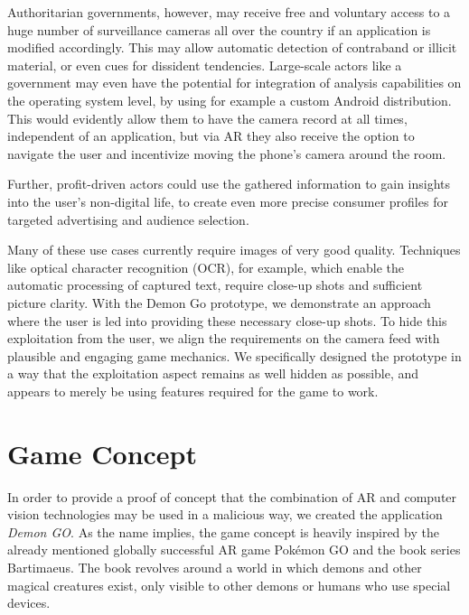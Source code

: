 Authoritarian governments, however, may receive free and voluntary access to a huge number of surveillance cameras all over the country if an application is modified accordingly. This may allow automatic detection of contraband or illicit material, or even cues for dissident tendencies. Large-scale actors like a government may even have the potential for integration of analysis capabilities on the operating system level, by using for example a custom Android distribution.
This would evidently allow them to have the camera record at all times, independent of an application, but via AR they also receive the option to navigate the user and incentivize moving the phone's camera around the room.

Further, profit-driven actors could use the gathered information to gain insights into the user's non-digital life, to create even more precise consumer profiles for targeted advertising and audience selection.

Many of these use cases currently require images of very good quality.
Techniques like optical character recognition (OCR), for example, which enable the automatic processing of captured text, require close-up shots and sufficient picture clarity.
With the Demon Go prototype, we demonstrate an approach where the user is led into providing these necessary close-up shots.
To hide this exploitation from the user, we align the requirements on the camera feed with plausible and engaging game mechanics.
We specifically designed the prototype in a way that the exploitation aspect remains as well hidden as possible, and appears to merely be using features required for the game to work.

\section{Game Concept}
\label{sec:concept}

In order to provide a proof of concept that the combination of AR and computer vision technologies may be used in a malicious way, we created the application \emph{Demon GO}.
As the name implies, the game concept is heavily inspired by the already mentioned globally successful AR game Pokémon GO and the book series Bartimaeus. The book revolves around a world in which demons and other magical creatures exist, only visible to other demons or humans who use special devices.~\cite{stroud2004bartimaeus}

